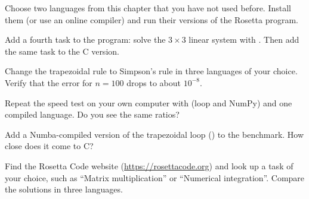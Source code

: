 \begin{exercises}
\item Choose two languages from this chapter that you have not used before. Install them
  (or use an online compiler) and run their versions of the Rosetta program.
\item Add a fourth task to the \py program: solve the $3\times3$ linear system with
  . Then add the same task to the C version.
\item Change the trapezoidal rule to Simpson's rule in three languages of your choice.
  Verify that the error for $n = 100$ drops to about $10^{-8}$.
\item Repeat the speed test on your own computer with \py (loop and NumPy) and one compiled
  language. Do you see the same ratios?
\item Add a Numba-compiled version of the trapezoidal loop ()
  to the \py benchmark. How close does it come to C?
\item Find the Rosetta Code website (\url{https://rosettacode.org}) and look up a task of
  your choice, such as ``Matrix multiplication'' or ``Numerical integration''. Compare the
  solutions in three languages.
\end{exercises}
